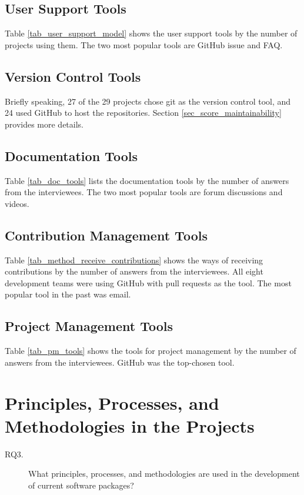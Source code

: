 \subsection{User Support Tools}
Table \ref{tab_user_support_model} shows the user support tools by the number of projects using them. The two most popular tools are GitHub issue and FAQ.

\subsection{Version Control Tools}
Briefly speaking, 27 of the 29 projects chose git as the version control tool, and 24 used GitHub to host the repositories. Section \ref{sec_score_maintainability} provides more details.

\subsection{Documentation Tools}
Table \ref{tab_doc_tools} lists the documentation tools by the number of answers from the interviewees. The two most popular tools are forum discussions and videos.

\subsection{Contribution Management Tools}
Table \ref{tab_method_receive_contributions} shows the ways of receiving contributions by the number of answers from the interviewees. All eight development teams were using GitHub with pull requests as the tool. The most popular tool in the past was email.

\subsection{Project Management Tools}
Table \ref{tab_pm_tools} shows the tools for project management by the number of answers from the interviewees. GitHub was the top-chosen tool.

\section{Principles, Processes, and Methodologies in the Projects}
\label{sec_rq_PPM}
\begin{description}
\item[RQ3.] What principles, processes, and methodologies are used in the development of current software packages?
\end{description}

